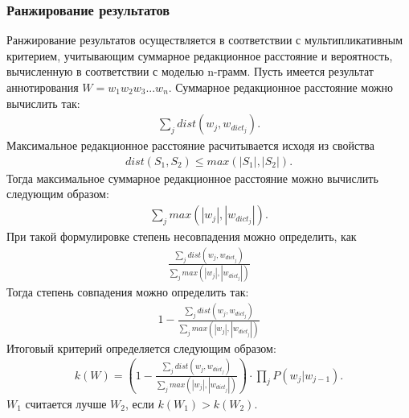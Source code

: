 \subsubsection{Ранжирование результатов}
Ранжирование результатов осуществляется в соответствии с мультипликативным критерием, учитывающим суммарное редакционное расстояние и вероятность, вычисленную в соответствии с моделью n-грамм. Пусть имеется результат аннотирования \(W = w_1w_2w_3...w_n\). Суммарное редакционное расстояние можно вычислить так:
\begin{align*}
	\displaystyle\sum_{j} dist(w_j,w_{dict_j}) .
\end{align*}
Максимальное редакционное расстояние расчитывается исходя из свойства
\begin{align}
	dist(S_1, S_2) \leq max(|S_1|, |S_2|).
\end{align}
Тогда максимальное суммарное редакционное расстояние можно вычислить следующим образом:
\begin{align*}
	\displaystyle\sum_{j} max(|w_j|,|w_{dict_j}|) .
\end{align*}
При такой формулировке степень несовпадения можно определить, как
\begin{align*}
	\frac{\displaystyle\sum_{j} dist(w_j,w_{dict_j}) }{\displaystyle\sum_{j} max(|w_j|,|w_{dict_j}|) }
\end{align*}
Тогда степень совпадения можно определить так:
\begin{align*}
	1 - \frac{\displaystyle\sum_{j} dist(w_j,w_{dict_j}) }{\displaystyle\sum_{j} max(|w_j|,|w_{dict_j}|) }
\end{align*}
Итоговый критерий определяется следующим образом:
\begin{align}
	k(W) = \left(1 - \frac{\displaystyle\sum_{j} dist(w_j,w_{dict_j}) }{\displaystyle\sum_{j} max(|w_j|,|w_{dict_j}|) }\right) \cdot \prod_{j}P(w_j|w_{j-1}).
\end{align}
\(W_1\) считается лучше \(W_2\), если \(k(W_1) > k(W_2)\).
